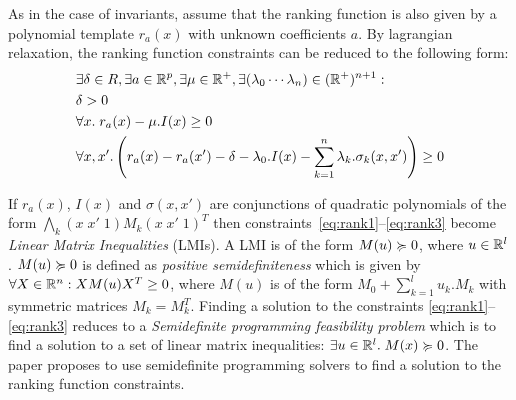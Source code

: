 As in the case of invariants, assume that the ranking function is also given by
a polynomial template $r_a(x)$ with unknown coefficients $a$. By lagrangian
relaxation, the ranking function constraints can be reduced to the following form:
%
\begin{align}
& \nonumber \exists \delta \in R, \exists a \in \real^p, \exists \mu \in \real^+, \exists (\lambda_0 \cdots \lambda_n) \in (\real^+)^{n+1} : \\
& \delta > 0 \label{eq:rank1}\\
& \forall x. \; r_a(x) - \mu.I(x)  \ge 0 \label{eq:rank2}\\
& \forall x,x'. \left( r_a(x) - r_a(x') - \delta - \lambda_0.I(x) - \sum \limits_{k=1}^{n} \lambda_k. \sigma_k(x,x') \right) \ge 0 \label{eq:rank3}
\end{align}

If $r_a(x)$, $I(x)$ and $\sigma(x,x')$ are conjunctions of quadratic polynomials 
of the form $\bigwedge_k (x \; x' \; 1) M_k (x \; x' \; 1)^T$ then constraints~\ref{eq:rank1}--\ref{eq:rank3} become \emph{Linear Matrix Inequalities} (LMIs). A LMI is of the form  $M(u) \succcurlyeq 0$, where $u \in \mathbb{R}^l$. 
$M(u) \succcurlyeq 0$ is defined as \emph{positive semidefiniteness} which is 
given by $\forall X \in \mathbb{R}^n: X M(u) X^T \ge 0$, where 
$M(u)$ is of the form $M_0 + \sum \limits_{k=1}^{l} u_k. M_k$ with
symmetric matrices $M_k = M_k^T$.
Finding a solution to the constraints \ref{eq:rank1}--\ref{eq:rank3}
reduces to a \emph{Semidefinite programming feasibility problem} which 
is to find a solution to a set of linear
matrix inequalities: $\exists u \in \mathbb{R}^l. \; M(x) \succcurlyeq 0$.
The paper proposes to use semidefinite programming solvers 
to find a solution to the ranking function constraints.

